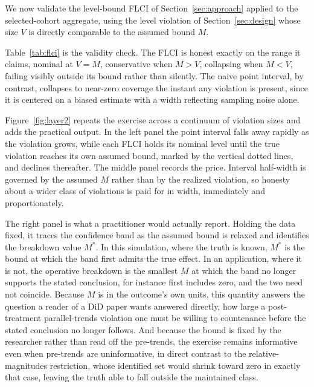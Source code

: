 \documentclass[12pt]{article}
\theoremstyle{remark}
\begin{document}
We now validate the level-bound FLCI of Section~\ref{sec:approach} applied to the selected-cohort
aggregate, using the level violation of Section~\ref{sec:design} whose size $V$ is directly comparable
to the assumed bound $M$.

Table~\ref{tab:flci} is the validity check. The FLCI is honest exactly on the range it claims, nominal at
$V=M$, conservative when $M>V$, collapsing when $M<V$, failing visibly outside its bound rather than
silently. The naive point interval, by contrast, collapses to near-zero coverage the instant any violation
is present, since it is centered on a biased estimate with a width reflecting sampling noise alone.

Figure~\ref{fig:layer2} repeats the exercise across a continuum of violation sizes and adds the practical
output. In the left panel the point interval falls away rapidly as the violation grows, while each FLCI
holds its nominal level until the true violation reaches its own assumed bound, marked by the vertical
dotted lines, and declines thereafter. The middle panel records the price. Interval half-width is
governed by the assumed $M$ rather than by the realized violation, so honesty about a wider class of
violations is paid for in width, immediately and proportionately.

The right panel is what a practitioner would actually report. Holding the data fixed, it traces the
confidence band as the assumed bound is relaxed and identifies the breakdown value $M^\ast$. In this
simulation, where the truth is known, $M^\ast$ is the bound at which the band first admits the true effect.
In an application, where it is not, the operative breakdown is the smallest $M$ at which the band no longer
supports the stated conclusion, for instance first includes zero, and the two need not coincide. Because $M$
is in the outcome's own units, this quantity answers the
question a reader of a DiD paper wants answered directly, how large a post-treatment parallel-trends
violation one must be willing to countenance before the stated conclusion no longer follows. And because
the bound is fixed by the researcher rather than read off the pre-trends, the exercise remains
informative even when pre-trends are uninformative, in direct contrast to the relative-magnitudes
restriction, whose identified set would shrink toward zero in exactly that case, leaving the truth able to
fall outside the maintained class.
\end{document}

